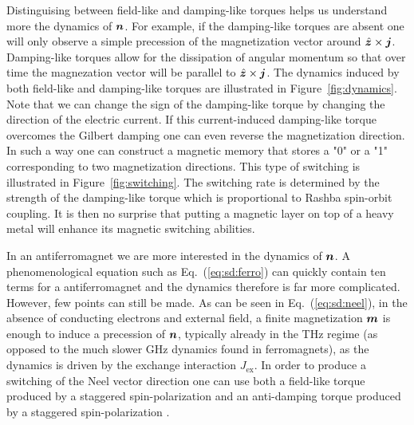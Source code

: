 Distinguising between field-like and damping-like torques helps us understand more the dynamics of $\boldsymbol{n}$. For example, if the damping-like torques are absent one will only observe a simple precession of the magnetization vector around $\hat{\boldsymbol{z}}\times\boldsymbol{j}$. Damping-like torques allow for the dissipation of angular momentum so that over time the magnezation vector will be parallel to $\hat{\boldsymbol{z}}\times\boldsymbol{j}$. The dynamics induced by both field-like and damping-like torques are illustrated in Figure~\ref{fig:dynamics}. Note that we can change the sign of the damping-like torque by changing the direction of the electric current. If this current-induced damping-like torque overcomes the Gilbert damping one can even reverse the magnetization direction. In such a way one can construct a magnetic memory that stores a "0" or a "1" corresponding to two magnetization directions. This type of switching is illustrated in Figure~\ref{fig:switching}. The switching rate is determined by the strength of the damping-like torque which is proportional to Rashba spin-orbit coupling. It is then no surprise that putting a magnetic layer on top of a heavy metal will enhance its magnetic switching abilities. 

In an antiferromagnet we are more interested in the dynamics of $\boldsymbol{n}$. A phenomenological equation such as Eq.~(\ref{eq:sd:ferro}) can quickly contain ten terms for a antiferromagnet and the dynamics therefore is far more complicated. However, few points can still be made. As can be seen in Eq.~(\ref{eq:sd:neel}), in the absence of conducting electrons and external field, a finite magnetization $\boldsymbol{m}$ is enough to induce a precession of $\boldsymbol{n}$, typically already in the THz regime (as opposed to the much slower GHz dynamics found in ferromagnets), as the dynamics is driven by the exchange interaction $J_\text{ex}$. In order to produce a switching of the Neel vector direction one can use both a field-like torque produced by a staggered spin-polarization and an anti-damping torque produced by a staggered spin-polarization \cite{fjaerbu_electrically_2017, cheng_terahertz_2016, khymyn_antiferromagnetic_2017}.

